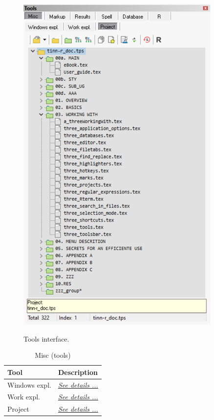 \begin{figure}[H]
  \includegraphics[scale=0.6]{./res/tools_misc_project.png}\\
  \caption{Tools interface.}
  \label{fig:tools_misc_options}
\end{figure}

\begin{table}[H]
  \begin{footnotesize}
    \begin{tabularx}{\textwidth}{>{\hsize=0.3\hsize}X>{\hsize=0.7\hsize}X}\\
      \hline
      \textbf{Tool} & \textbf{Description} \\
      \hline
      Windows expl. & \textit{\href{\#working\_tools\_misc\_windowsexpl}{See details ...}} \\
      Work expl. & \textit{\href{\#working\_tools\_misc\_workexpl}{See details ...}} \\
      Project & \textit{\href{\#working\_tools\_misc\_project}{See details ...}} \\
      \hline
    \end{tabularx}
  \end{footnotesize}
  \caption{Misc (tools)}
  \label{tab:tools_misc}
\end{table}

